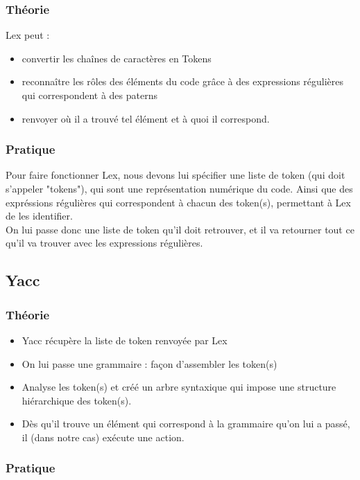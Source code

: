 \documentclass[a4paper,12pt]{article}
\begin{document}
		\subsubsection{Théorie}
			Lex peut :
			\begin{itemize}
				\item convertir les chaînes de caractères en Tokens
				\item reconnaître les rôles des éléments du code grâce à des expressions régulières qui correspondent à des 							  paterns
				\item renvoyer où il a trouvé tel élément et à quoi il correspond.
			\end{itemize}
	
		\subsubsection{Pratique}

			Pour faire fonctionner Lex, nous devons lui spécifier une liste de token (qui doit s'appeler "tokens"), qui sont une 				représentation numérique du code. Ainsi que des expréssions régulières qui correspondent à chacun des token(s), 					permettant à Lex de les identifier. \\
			On lui passe donc une liste de token qu'il doit retrouver, et il va retourner tout ce qu'il va trouver avec les 					expressions régulières.
	
	\subsection{Yacc}

		\subsubsection{Théorie}
			\begin{itemize}
				\item Yacc récupère la liste de token renvoyée par Lex
				\item On lui passe une grammaire : façon d'assembler les token(s)
				\item Analyse les token(s) et créé un arbre syntaxique qui impose une structure hiérarchique des token(s).
				\item Dès qu'il trouve un élément qui correspond à la grammaire qu'on lui a passé, il (dans notre cas) exécute une 					  action.
			\end{itemize}	 	
	
		\subsubsection{Pratique}
	
\end{document}

